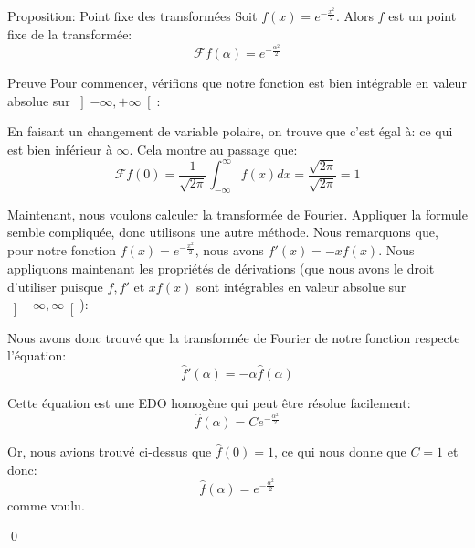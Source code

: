 \documentclass[a4paper]{article}
\begin{document}
\begin{parag}{Proposition: Point fixe des transformées}
    Soit $f\left(x\right) = e^{-\frac{x^2}{2}}$. Alors $f$ est un point fixe de la transformée: 
    \[\mathcal{F} f\left(\alpha\right) = e^{- \frac{\alpha ^2}{2}}\]
    
    \begin{subparag}{Preuve}
        Pour commencer, vérifions que notre fonction est bien intégrable en valeur absolue sur $\left]-\infty, +\infty\right[ $:

        En faisant un changement de variable polaire, on trouve que c'est égal à:
        ce qui est bien inférieur à $\infty$. Cela montre au passage que: 
        \[\mathcal{F} f\left(0\right) = \frac{1}{\sqrt{2\pi}} \int_{-\infty}^{\infty} f\left(x\right)dx = \frac{\sqrt{2\pi}}{\sqrt{2\pi}} = 1\]
        
        Maintenant, nous voulons calculer la transformée de Fourier. Appliquer la formule semble compliquée, donc utilisons une autre méthode. Nous remarquons que, pour notre fonction $f\left(x\right) = e^{-\frac{x^2}{2}}$, nous avons $f'\left(x\right) = -xf\left(x\right)$. Nous appliquons maintenant les propriétés de dérivations (que nous avons le droit d'utiliser puisque $f, f'$ et $xf\left(x\right)$ sont intégrables en valeur absolue sur $\left]-\infty, \infty\right[ $): 
        
        Nous avons donc trouvé que la transformée de Fourier de notre fonction respecte l'équation:
        \[\hat{f}'\left(\alpha\right) = -\alpha \hat{f}\left(\alpha\right)\]
        
        Cette équation est une EDO homogène qui peut être résolue facilement: 
        \[\hat{f}\left(\alpha\right) = C e^{-\frac{\alpha ^2}{2}}\]
        
        Or, nous avions trouvé ci-dessus que $\hat{f}\left(0\right) = 1$, ce qui nous donne que $C = 1$ et donc: 
        \[\hat{f}\left(\alpha\right) = e^{- \frac{\alpha ^2 }{2}}\]
        comme voulu.

        \qed
    \end{subparag}
\end{parag}
\end{document}
